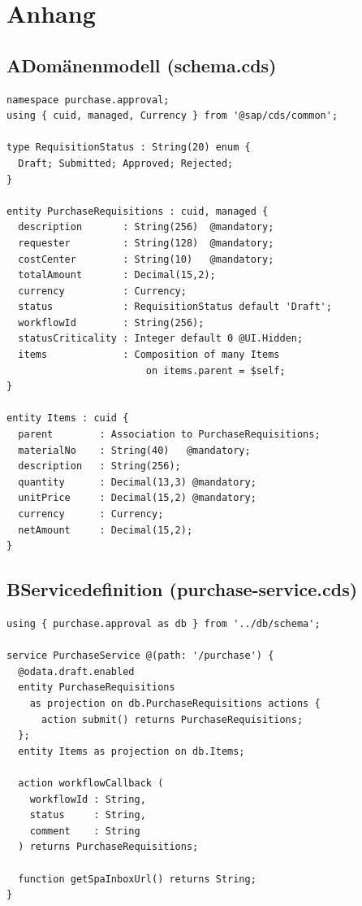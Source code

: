 \section*{Anhang}

\subsection*{A\quad Domänenmodell (schema.cds)}
\begin{lstlisting}[caption={Vollständiges CDS-Schema},label={lst:anhang-schema}]
namespace purchase.approval;
using { cuid, managed, Currency } from '@sap/cds/common';

type RequisitionStatus : String(20) enum {
  Draft; Submitted; Approved; Rejected;
}

entity PurchaseRequisitions : cuid, managed {
  description       : String(256)  @mandatory;
  requester         : String(128)  @mandatory;
  costCenter        : String(10)   @mandatory;
  totalAmount       : Decimal(15,2);
  currency          : Currency;
  status            : RequisitionStatus default 'Draft';
  workflowId        : String(256);
  statusCriticality : Integer default 0 @UI.Hidden;
  items             : Composition of many Items
                        on items.parent = $self;
}

entity Items : cuid {
  parent        : Association to PurchaseRequisitions;
  materialNo    : String(40)   @mandatory;
  description   : String(256);
  quantity      : Decimal(13,3) @mandatory;
  unitPrice     : Decimal(15,2) @mandatory;
  currency      : Currency;
  netAmount     : Decimal(15,2);
}
\end{lstlisting}

\subsection*{B\quad Servicedefinition (purchase-service.cds)}
\begin{lstlisting}[caption={CDS-Servicedefinition mit Draft-Support und Aktionen},label={lst:anhang-service}]
using { purchase.approval as db } from '../db/schema';

service PurchaseService @(path: '/purchase') {
  @odata.draft.enabled
  entity PurchaseRequisitions
    as projection on db.PurchaseRequisitions actions {
      action submit() returns PurchaseRequisitions;
  };
  entity Items as projection on db.Items;

  action workflowCallback (
    workflowId : String,
    status     : String,
    comment    : String
  ) returns PurchaseRequisitions;

  function getSpaInboxUrl() returns String;
}
\end{lstlisting}

